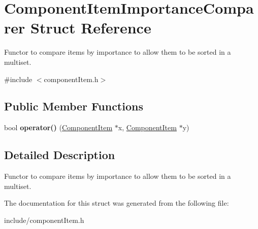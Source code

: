\hypertarget{structComponentItemImportanceComparer}{
\section{\-Component\-Item\-Importance\-Comparer \-Struct \-Reference}
\label{d6/d7a/structComponentItemImportanceComparer}
}


\-Functor to compare items by importance to allow them to be sorted in a multiset.  




{\ttfamily \#include $<$component\-Item.\-h$>$}

\subsection*{\-Public \-Member \-Functions}
\begin{DoxyCompactItemize}
\item 
\hypertarget{structComponentItemImportanceComparer_ae3ccbea7c8c9eefcd8dae955a25863e7}{
bool {\bfseries operator()} (\hyperlink{classComponentItem}{\-Component\-Item} $\ast$x, \hyperlink{classComponentItem}{\-Component\-Item} $\ast$y)}
\label{d6/d7a/structComponentItemImportanceComparer_ae3ccbea7c8c9eefcd8dae955a25863e7}

\end{DoxyCompactItemize}


\subsection{\-Detailed \-Description}
\-Functor to compare items by importance to allow them to be sorted in a multiset. 

\-The documentation for this struct was generated from the following file\-:\begin{DoxyCompactItemize}
\item 
include/component\-Item.\-h\end{DoxyCompactItemize}
